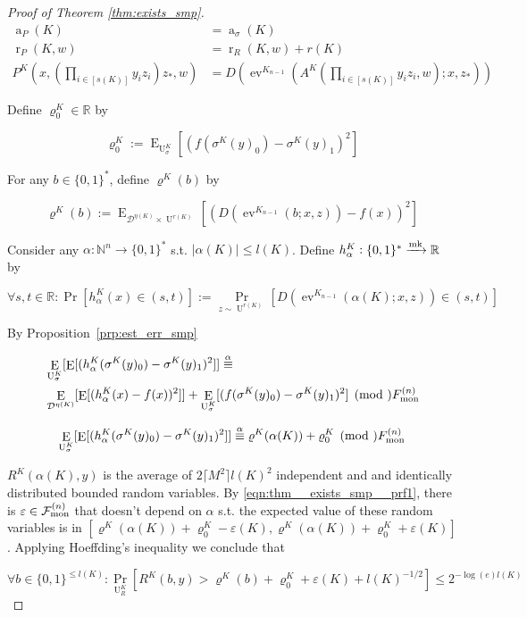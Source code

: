 \documentclass[11pt]{article}
\numberwithin{equation}{section}
\theoremstyle{definition}
\theoremstyle{plain}
\newcommand{\Bool}{\{0,1\}}
\newcommand{\Words}{{\Bool^*}}
\DeclareMathOperator{\Prb}{Pr}
\DeclareMathOperator{\E}{E}
\DeclareMathOperator{\Ev}{ev}
\DeclareMathOperator{\R}{r}
\DeclareMathOperator{\A}{a}
\DeclareMathOperator{\Un}{U}
\newcommand{\Nats}{\mathbb{N}}
\newcommand{\Reals}{\mathbb{R}}
\newcommand{\Abs}[1]{\lvert #1 \rvert}
\newcommand{\Ceil}[1]{\lceil #1 \rceil}
\newcommand{\Dist}{\mathcal{D}}
\newcommand{\Fall}{\mathcal{F}}
\newcommand{\FallM}{\Fall_{\textnormal{mon}}^{(n)}}
\newcommand{\Markov}{\xrightarrow{\textnormal{mk}}}
\begin{document}
\begin{proof}[Proof of Theorem \ref{thm:exists_smp}]
\begin{align}
\label{eqn:thm__exists_smp__p_adv}\A_P(K) &= \A_\sigma(K) \\
\label{eqn:thm__exists_smp__p_rnd}\R_P(K,w) &= \R_R(K,w) + r(K) \\
\label{eqn:thm__exists_smp__p_alg}P^K(x,\left(\prod_{i \in [s(K)]}y_i z_i\right)z_{*},w) &= D(\Ev^{K_{n-1}}(A^K\left(\prod_{i \in [s(K)]}y_i z_i,w\right);x,z_{*}))
\end{align}

Define ${\varrho_0^K \in \Reals}$ by

\[\varrho_0^K:=\E_{\Un_\sigma^K}[(f(\sigma^K(y)_0)-\sigma^K(y)_1)^2]\]

For any ${b \in \Words}$, define ${\varrho^K(b)}$ by

\[\varrho^K(b):=\E_{\Dist^{\eta(K)} \times \Un^{r(K)}}[(D(\Ev^{K_{n-1}}(b;x,z))-f(x))^2]\]

Consider any ${\alpha: \Nats^n \rightarrow \Words}$ s.t. ${\Abs{\alpha(K)} \leq l(K)}$. Define ${h_\alpha^K: \Words \Markov \Reals}$ by

\[\forall s,t \in \Reals: \Pr[h_\alpha^K(x) \in (s,t)]:=\Prb_{z \sim \Un^{r(K)}}[D(\Ev^{K_{n-1}}(\alpha(K);x,z)) \in (s,t)]\]

By Proposition~\ref{prp:est_err_smp}

\begin{align*}
&\E_{\Un_\sigma^K}[\E[(h_\alpha^K(\sigma^K(y)_0)-\sigma^K(y)_1)^2]] \overset{\alpha}{\equiv}\\ 
&\E_{\Dist^{\eta(K)}}[\E[(h_\alpha^K(x)-f(x))^2]] + \E_{\Un_\sigma^K}[(f(\sigma^K(y)_0)-\sigma^K(y)_1)^2] \pmod \FallM 
\end{align*}

\begin{equation}
\label{eqn:thm__exists_smp__prf1}
\E_{\Un_\sigma^K}[\E[(h_\alpha^K(\sigma^K(y)_0)-\sigma^K(y)_1)^2]] \overset{\alpha}{\equiv} \varrho^K(\alpha(K)) + \varrho_0^K \pmod \FallM
\end{equation}

${R^K(\alpha(K),y)}$ is the average of ${2\Ceil{M^2}l(K)^2}$ independent and and identically distributed bounded random variables. By \ref{eqn:thm__exists_smp__prf1}, there is ${\varepsilon \in \FallM}$ that doesn't depend on ${\alpha}$ s.t. the expected value of these random variables is in ${[\varrho^K(\alpha(K)) + \varrho_0^K - \varepsilon(K), \varrho^K(\alpha(K)) + \varrho_0^K + \varepsilon(K)]}$. Applying Hoeffding's inequality we conclude that

\[\forall b \in \Bool^{\leq l(K)}: \Prb_{\Un_R^K}[R^K(b,y) > \varrho^K(b) + \varrho_0^K  + \varepsilon(K) + l(K)^{-1/2}] \leq 2^{-\log(e) l(K)}\]


\end{proof}
\end{document}
